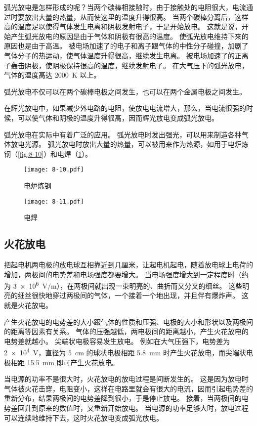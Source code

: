 弧光放电是怎样形成的呢？当两个碳棒相接触时，由于接触处的电阻很大，电流通过时要放出大量的热量，从而使这里的温度升得很高。
当两个碳棒分离后，这样高的温度足以使得气体发生电离和阴极发射电子，于是开始放电。
这就是说，开始产生弧光放电的原因是由于气体和阴极有很高的温度。
使弧光放电维持下来的原因也是由于高温。
被电场加速了的电子和离子跟气体的中性分子碰撞，加剧了气体分子的热运动，使气体温度升得很高，继续发生电离。
被电场加速了的正离子轰击阴极，使阴极保持很高的温度，继续发射电子。
在大气压下的弧光放电，气体的温度高达 \qty{2000}{K} 以上。

弧光放电不仅可以在两个碳棒电极之间发生，也可以在两个金属电极之间发生。

在辉光放电中，如果减少外电路的电阻，使放电电流增大，那么，当电流很强的时候，可以使气体和阴极的温度升得很高，因而辉光放电变成弧光放电。

弧光放电在实际中有着广泛的应用。
弧光放电时发出强光，可以用来制造各种气体放电光源。
弧光放电时放出大量的热量，可以被用来作为热源，如用于电炉炼钢（\cref{fig:8-10}）和电焊（\cref{fig:8-11}）。
\begin{figure}
  \begin{minipage}[b]{0.48\linewidth}\centering
    \texttt{[image: 8-10.pdf]}
    \caption{电炉炼钢}\label{fig:8-10}
  \end{minipage}
  \begin{minipage}[b]{0.48\linewidth}\centering
    \texttt{[image: 8-11.pdf]}
    \caption{电焊}\label{fig:8-11}
  \end{minipage}
\end{figure}

\subsection{火花放电}
把起电机两电极的放电球互相靠近到几厘米，让起电机起电，随着放电球上电荷的增加，两极间的电势差和电场强度都要增大。
当电场强度增大到一定程度时（约为 \qty{3e6}{V/m}），在两极间就出现一束明亮的、曲折而又分叉的细丝。
这些明亮的细丝很快地穿过两极间的气体，一个接着一个地出现，并且伴有爆炸声。
这就是火花放电。

产生火花放电的电势差的大小跟气体的性质和压强、电极的大小和形状以及两极间的距离等因素有关系。
气体的压强越低，两电极间的距离越小，产生火花放电的电势差就越小。
尖端状电极容易发生放电。
例如在大气压强下，电势差为 \qty{2e4}{V}，直径为 \qty{5}{cm} 的球状电极相距 \qty{5.8}{mm} 时产生火花放电，而尖端状电极相距 \qty{15.5}{mm} 即可产生火花放电。

当电源的功率不是很大时，火花放电的放电过程是间断发生的。
这是因为放电时气体被火花击穿，电阻变小，这样在电路里就会有很大的电流，因而引起电势差的重新分布，结果两极间的电势差降到很小，于是停止放电。
接着，当两极间的电势差回升到原来的数值时，又重新开始放电。
当电源的功率足够大时，放电过程可以连续地维持下去，这时火花放电变成弧光放电。

